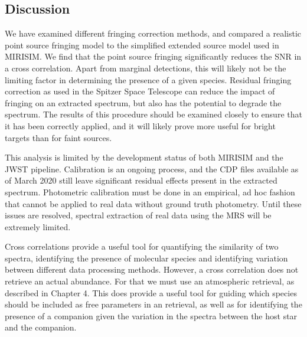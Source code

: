 \subsection{Discussion}
We have examined different fringing correction methods, and compared a realistic point source fringing model to the simplified extended source model used in MIRISIM.
We find that the point source fringing significantly reduces the SNR in a cross correlation. 
Apart from marginal detections, this will likely not be the limiting factor in determining the presence of a given species.
Residual fringing correction as used in the Spitzer Space Telescope can reduce the impact of fringing on an extracted spectrum, but also has the potential to degrade the spectrum.
The results of this procedure should be examined closely to ensure that it has been correctly applied, and it will likely prove more useful for bright targets than for faint sources. 

This analysis is limited by the development status of both MIRISIM and the JWST pipeline. 
Calibration is an ongoing process, and the CDP files available as of March 2020 still leave significant residual effects present in the extracted spectrum.
Photometric calibration must be done in an empirical, ad hoc fashion that cannot be applied to real data without ground truth photometry.
Until these issues are resolved, spectral extraction of real data using the MRS will be extremely limited.

Cross correlations provide a useful tool for quantifying the similarity of two spectra, identifying the presence of molecular species and identifying variation between different data processing methods.
However, a cross correlation does not retrieve an actual abundance.
For that we must use an atmospheric retrieval, as described in Chapter 4.
This does provide a useful tool for guiding which species should be included as free parameters in an retrieval, as well as for identifying the presence of a companion given the variation in the spectra between the host star and the companion.